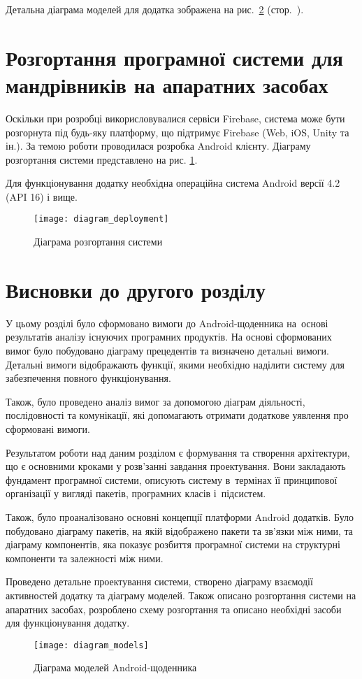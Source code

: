 \documentclass[../main.tex]{subfiles}
\begin{document}
Детальна діаграма моделей для додатка зображена на рис.~\ref{diagram:models} (стор.~\pageref{diagram:models}).


\section{Розгортання програмної системи для мандрівників на апаратних засобах}
Оскільки при розробці викорисловувалися сервіси Firebase, система може бути розгорнута під будь-яку платформу, що підтримує Firebase (Web, iOS, Unity та ін.). За темою роботи проводилася розробка Android клієнту. Діаграму розгортання системи представлено на рис. \ref{diagram:deployment}.

Для функціонування додатку необхідна операційна система Android версії 4.2 (API 16) і вище.

\begin{figure}[H]
	\centering
	\texttt{[image: diagram\_deployment]}
	\caption{Діаграма розгортання системи}
	\label{diagram:deployment}
\end{figure}

\section{Висновки до другого розділу}

У цьому розділі було сформовано вимоги до Android-щоденника на~основі результатів аналізу існуючих програмних продуктів. На основі сформованих вимог було побудовано діаграму прецедентів та визначено  детальні вимоги. Детальні вимоги відображають функції, якими необхідно наділити систему для забезпечення повного функціонування.

Також, було проведено аналіз вимог за допомогою діаграм діяльності, послідовності та комунікації, які допомагають отримати додаткове уявлення про сформовані вимоги.

Результатом роботи над даним розділом є формування та створення архітектури, що є основними кроками у розв'занні завдання проектування. Вони закладають фундамент програмної системи, описують систему в~термінах її принципової організації у вигляді пакетів, програмних класів і~підсистем.

\newpage
Також, було проаналізовано основні концепції платформи Android додатків. Було побудовано діаграму пакетів, на якій відображено пакети та зв'язки між ними, та діаграму компонентів, яка показує розбиття програмної системи на структурні компоненти та залежності між ними.

Проведено детальне проектування системи, створено діаграму взаємодії активностей додатку та діаграму моделей. Також описано розгортання системи на апаратних засобах, розроблено схему розгортання та описано необхідні засоби для функціонування додатку.

\begin{figure}[pt] %
	\centering
	\texttt{[image: diagram\_models]}
	\caption{Діаграма моделей Android-щоденника} %
	\label{diagram:models}
\end{figure}
\end{document}
